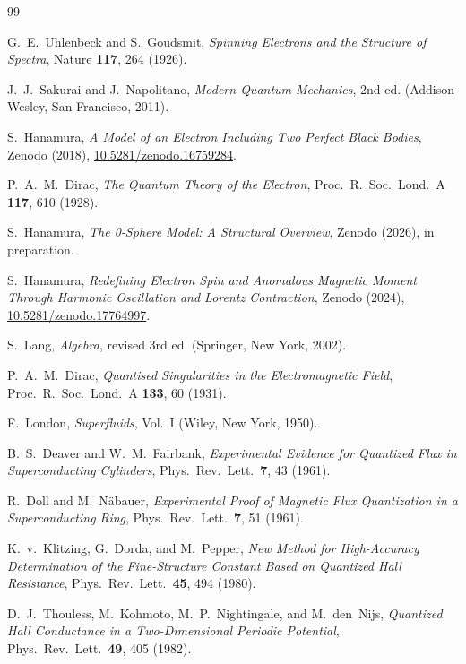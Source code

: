 \documentclass[%
 reprint, amsmath,amssymb, aps, prb, ]{revtex4-2}
\numberwithin{equation}{section}
\begin{document}
\begin{thebibliography}{99}

G.~E.~Uhlenbeck and S.~Goudsmit,
\emph{Spinning Electrons and the Structure of Spectra},
Nature \textbf{117}, 264 (1926).

J.~J.~Sakurai and J.~Napolitano,
\emph{Modern Quantum Mechanics}, 2nd ed.
(Addison-Wesley, San Francisco, 2011).

S.~Hanamura,
\emph{A Model of an Electron Including Two Perfect Black Bodies},
Zenodo (2018), \href{https://doi.org/10.5281/zenodo.16759284}{10.5281/zenodo.16759284}.

P.~A.~M.~Dirac,
\emph{The Quantum Theory of the Electron},
Proc.~R.~Soc.~Lond.~A \textbf{117}, 610 (1928).

S.~Hanamura,
\emph{The 0-Sphere Model: A Structural Overview},
Zenodo (2026), in preparation.

S.~Hanamura,
\emph{Redefining Electron Spin and Anomalous Magnetic Moment Through Harmonic Oscillation and Lorentz Contraction},
Zenodo (2024), \href{https://doi.org/10.5281/zenodo.17764997}{10.5281/zenodo.17764997}.

S.~Lang,
\emph{Algebra}, revised 3rd ed.
(Springer, New York, 2002).

P.~A.~M.~Dirac,
\emph{Quantised Singularities in the Electromagnetic Field},
Proc.~R.~Soc.~Lond.~A \textbf{133}, 60 (1931).

F.~London,
\emph{Superfluids}, Vol.~I
(Wiley, New York, 1950).

B.~S.~Deaver and W.~M.~Fairbank,
\emph{Experimental Evidence for Quantized Flux in Superconducting Cylinders},
Phys.~Rev.~Lett.\ \textbf{7}, 43 (1961).

R.~Doll and M.~N\"abauer,
\emph{Experimental Proof of Magnetic Flux Quantization in a Superconducting Ring},
Phys.~Rev.~Lett.\ \textbf{7}, 51 (1961).

K.~v.~Klitzing, G.~Dorda, and M.~Pepper,
\emph{New Method for High-Accuracy Determination of the Fine-Structure Constant Based on Quantized Hall Resistance},
Phys.~Rev.~Lett.\ \textbf{45}, 494 (1980).

D.~J.~Thouless, M.~Kohmoto, M.~P.~Nightingale, and M.~den~Nijs,
\emph{Quantized Hall Conductance in a Two-Dimensional Periodic Potential},
Phys.~Rev.~Lett.\ \textbf{49}, 405 (1982).


\end{thebibliography}
\end{document}
